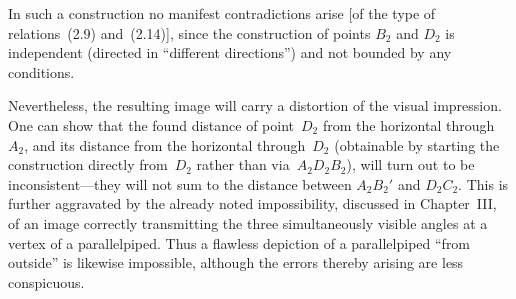 In such a construction no manifest contradictions arise [of the type of relations~(2.9)
and~(2.14)], since the construction of points $B_2$ and $D_2$ is independent (directed in
``different directions'') and not bounded by any conditions.

Nevertheless, the resulting image will carry a distortion of the visual impression.  One can
show that the found distance of point~$D_2$ from the horizontal through~$A_2$, and its
distance from the horizontal through~$D_2$ (obtainable by starting the construction
directly from~$D_2$ rather than via~$A_2D_2B_2$), will turn out to be inconsistent---they
will not sum to the distance between $A_2B_2'$ and $D_2C_2$.  This is further aggravated
by the already noted impossibility, discussed in Chapter~III, of an image correctly
transmitting the three simultaneously visible angles at a vertex of a parallelpiped.  Thus a
flawless depiction of a parallelpiped ``from outside'' is likewise impossible, although the
errors thereby arising are less conspicuous.

